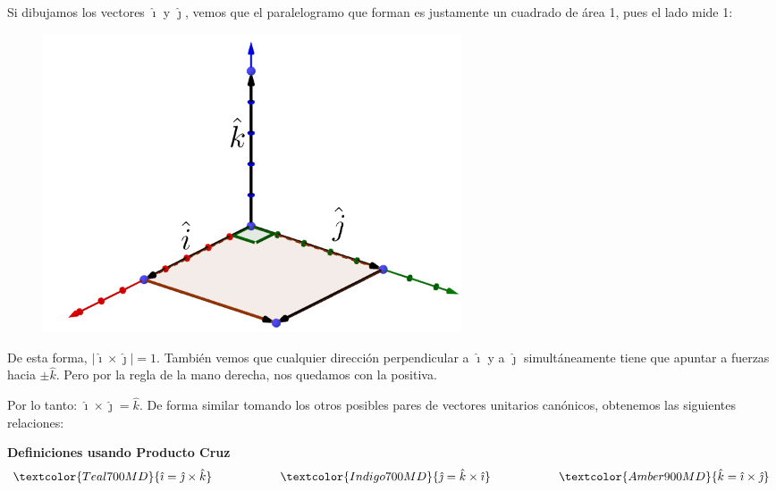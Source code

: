\documentclass[12pt, fleqn]{report}                             %
\DeclareMathOperator \Space {\quad}                             %
\DeclareMathOperator \MegaSpace {\quad \quad}                   %
\theoremstyle{break}                                            %
\newcommand{\hati} {\hat{\imath}}                               %
\newcommand{\hatj} {\hat{\jmath}}                               %
\newcommand{\hatk} {\hat{k}}                                    %
\newcommand{\abs}[1]{\left\lvert #1 \right\lvert}               %
\begin{document}
                Si dibujamos los vectores $\hati$ y $\hatj$, vemos que el paralelogramo que
                forman es justamente un cuadrado de área 1, pues el lado mide 1:
                \begin{figure}[H]
                    \centering
                    \includegraphics[width=0.60\textwidth]{unitVectors}
                \end{figure}
            
                De esta forma, $\abs{\hati \times \hatj} = 1$. También vemos que cualquier
                dirección perpendicular a $\hati$ y a $\hatj$ simultáneamente tiene que apuntar
                a fuerzas hacia $\pm \hatk$. Pero por la regla de la mano derecha, nos quedamos con
                la positiva.

                Por lo tanto: $\hati \times \hatj = \hatk$. De forma similar tomando los otros
                posibles pares de vectores unitarios canónicos, obtenemos las siguientes relaciones:

                \vspace{1.5em}
                \textbf{Definiciones usando Producto Cruz}
                    \begin{align*}
                        \textcolor{Teal700MD}
                        {\hati = \hatj \times \hatk}
                            \MegaSpace \MegaSpace \Space
                        \textcolor{Indigo700MD}
                        {\hatj = \hatk \times \hati}
                            \MegaSpace \MegaSpace \Space
                        \textcolor{Amber900MD}
                        {\hatk = \hati \times \hatj}
                    \end{align*}
\end{document}
